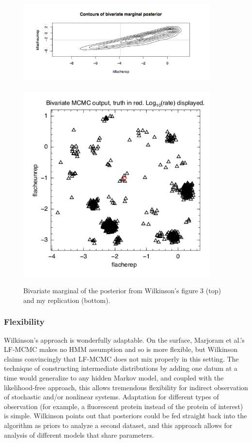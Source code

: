 \documentclass{article}
\begin{document}
\begin{figure}[h!]
\begin{center}
\includegraphics[height=2in,width=4in]{wilkinson_fig3_biv.png}
\includegraphics[height=4in,width=4in]{SigD_trial_may27.png}
\caption{Bivariate marginal of the posterior from Wilkinson's figure 3 (top) and my replication (bottom).}
\end{center}
\label{fig:SigD_trial_may27}
\end{figure}


\subsubsection{Flexibility}
Wilkinson's approach is wonderfully adaptable. On the surface, Marjoram et al.'s LF-MCMC makes no HMM assumption and so is more flexible, but Wilkinson claims convincingly that LF-MCMC does not mix properly in this setting. The technique of constructing intermediate distributions by adding one datum at a time would generalize to any hidden Markov model, and coupled with the likelihood-free approach, this allows tremendous flexibility for indirect observation of stochastic and/or nonlinear systems. Adaptation for different types of observation (for example, a fluorescent protein instead of the protein of interest) is simple. Wilkinson points out that posteriors could be fed straight back into the algorithm as priors to analyze a second dataset, and this approach allows for analysis of different models that share parameters.
\end{document}
